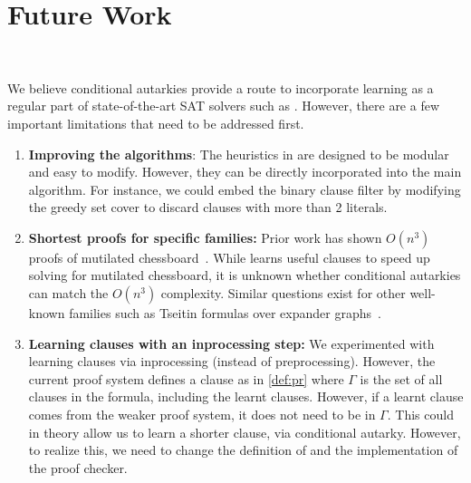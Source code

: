 \section{Future Work}~\label{sec:futurework}


We believe conditional autarkies provide a route to incorporate \pr learning
as a regular part of state-of-the-art SAT solvers such as \cadical. However,
there are a few important limitations that need to be addressed first.

\begin{enumerate}
    \item \textbf{Improving the algorithms}: The heuristics in \tool are
    designed to be modular and easy to modify. However, they can
    be directly incorporated into the main algorithm. For instance, we could embed the
    binary clause filter by modifying the greedy set cover to discard clauses
    with more than 2 literals.
    \item \textbf{Shortest proofs for specific families:} Prior work has shown
    $O(n^3)$ \pr proofs of mutilated chessboard~\cite{mutilatedchessboard-pr}.
    While \tool learns useful clauses to speed up solving for
    mutilated chessboard, it is unknown whether conditional autarkies can match
    the $O(n^3)$ complexity. Similar questions exist for other well-known
    families such as Tseitin formulas over expander
    graphs~\cite{er,hardexamplesresolution}.
    \item \textbf{Learning \pr clauses with an inprocessing step:} We
    experimented with learning \pr clauses via inprocessing (instead of
    preprocessing). However, the current \pr proof system defines a \pr clause
    as in \autoref{def:pr} where $\Gamma$ is the set of all clauses in the
    formula, including the learnt clauses. However, if a learnt clause comes
    from the weaker proof system, it does not need to be in $\Gamma$. This could
    in theory allow us to learn a shorter clause, via conditional autarky.
    However, to realize this, we need to change the definition of \pr and the
    implementation of the \pr proof checker.

    
\end{enumerate}